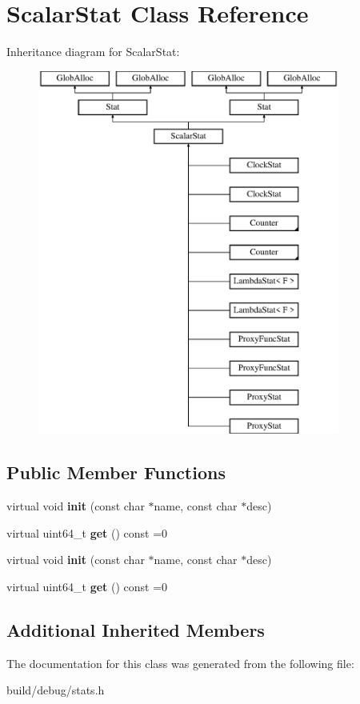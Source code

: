 \hypertarget{classScalarStat}{\section{Scalar\-Stat Class Reference}
\label{classScalarStat}
}
Inheritance diagram for Scalar\-Stat\-:\begin{figure}[H]
\begin{center}
\leavevmode
\includegraphics[height=12.000000cm]{classScalarStat}
\end{center}
\end{figure}
\subsection*{Public Member Functions}
\begin{DoxyCompactItemize}
\item 
\hypertarget{classScalarStat_ad144d5707035ec9e4e027a4a05461bdc}{virtual void {\bfseries init} (const char $\ast$name, const char $\ast$desc)}\label{classScalarStat_ad144d5707035ec9e4e027a4a05461bdc}

\item 
\hypertarget{classScalarStat_af0769ffb26acb180dfaebfe736f2b1fa}{virtual uint64\-\_\-t {\bfseries get} () const =0}\label{classScalarStat_af0769ffb26acb180dfaebfe736f2b1fa}

\item 
\hypertarget{classScalarStat_ad144d5707035ec9e4e027a4a05461bdc}{virtual void {\bfseries init} (const char $\ast$name, const char $\ast$desc)}\label{classScalarStat_ad144d5707035ec9e4e027a4a05461bdc}

\item 
\hypertarget{classScalarStat_af0769ffb26acb180dfaebfe736f2b1fa}{virtual uint64\-\_\-t {\bfseries get} () const =0}\label{classScalarStat_af0769ffb26acb180dfaebfe736f2b1fa}

\end{DoxyCompactItemize}
\subsection*{Additional Inherited Members}


The documentation for this class was generated from the following file\-:\begin{DoxyCompactItemize}
\item 
build/debug/stats.\-h\end{DoxyCompactItemize}

